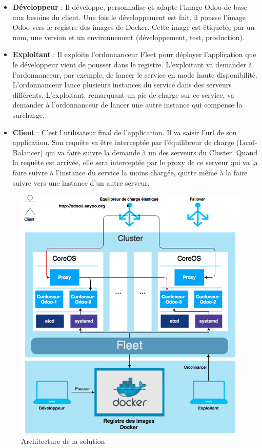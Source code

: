 \begin{onehalfspace}
\begin{itemize}
 	\item \textbf{Développeur} : Il développe, personnalise et adapte l'image Odoo de base aux besoins du client. Une fois le développement est fait, il pousse l'image Odoo vers le registre des images de Docker. Cette image est étiquetée par un nom, une version et un environnement (développement, test, production).
 	\item \textbf{Exploitant} : Il exploite l'ordonnanceur Fleet pour déployer l'application que le développeur vient de pousser dans le registre. L'exploitant va demander à l'ordonnanceur, par exemple, de lancer le service en mode haute disponibilité. L'ordonnanceur lance plusieurs instances du service dans des serveurs différents. L'exploitant, remarquant un pic de charge sur ce service, va demander à l'ordonnanceur de lancer une autre instance qui compense la surcharge.
 	\item \textbf{Client} : C'est l'utilisateur final de l'application. Il va saisir l'\acrshort{url} de son application. Son requête va être interceptée par l'équilibreur de charge (Load-Balancer) qui va faire suivre la demande à un des serveurs du Cluster. Quand la requête est arrivée, elle sera interceptée par le proxy de ce serveur qui va la faire suivre à l'instance du service la moins chargée, quitte même à la faire suivre vers une instance d'un autre serveur.
 \end{itemize} 

\begin{figure}[H]
\centering
\includegraphics [scale=0.7]{chapitre4/assets/architecture}
\caption{Architecture de la solution}
\label{fig:architecture}
\end{figure}


\end{onehalfspace}
